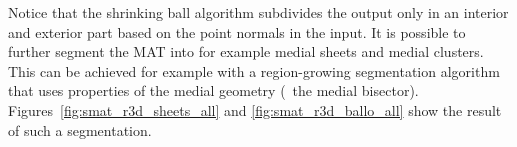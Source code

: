 Notice that the shrinking ball algorithm subdivides the output only in an interior and exterior part based on the point normals in the input. 
It is possible to further segment the MAT into for example medial sheets and medial clusters.
This can be achieved for example with a region-growing segmentation algorithm that uses properties of the medial geometry (\eg\ the medial bisector). 
Figures~\ref{fig:smat_r3d_sheets_all} and \ref{fig:smat_r3d_ballo_all} show the result of such a segmentation.


